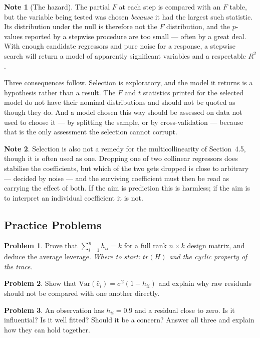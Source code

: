 \documentclass[11pt,a4paper]{article}
\theoremstyle{definition}
\newtheorem*{note}{Note}
\newtheorem{problemx}{Problem}[section]
\newenvironment{problem}{\begin{problemx}}{\end{problemx}}
\begin{document}
\begin{note}[The hazard]
The partial $F$ at each step is compared with an $F$ table, but the variable
being tested was chosen \emph{because} it had the largest such statistic. Its
distribution under the null is therefore not the $F$ distribution, and the
$p$-values reported by a stepwise procedure are too small --- often by a
great deal. With enough candidate regressors and pure noise for a response, a
stepwise search will return a model of apparently significant variables and a
respectable $R^2$.

Three consequences follow. Selection is exploratory, and the model it returns
is a hypothesis rather than a result. The $F$ and $t$ statistics printed for
the selected model do not have their nominal distributions and should not be
quoted as though they do. And a model chosen this way should be assessed on
data not used to choose it --- by splitting the sample, or by
cross-validation --- because that is the only assessment the selection cannot
corrupt.
\end{note}

\begin{note}
Selection is also not a remedy for the multicollinearity of Section~4.5,
though it is often used as one. Dropping one of two collinear regressors does
stabilise the coefficients, but which of the two gets dropped is close to
arbitrary --- decided by noise --- and the surviving coefficient must then be
read as carrying the effect of both. If the aim is prediction this is
harmless; if the aim is to interpret an individual coefficient it is not.
\end{note}

\subsection{Practice Problems}

\begin{problem}
Prove that $\sum_{i=1}^{n}h_{ii}=k$ for a full rank $n\times k$ design matrix,
and deduce the average leverage.
\emph{Where to start: $tr(H)$ and the cyclic property of the trace.}
\end{problem}

\begin{problem}
Show that $\text{Var}\left(\widehat{e}_i\right)=\sigma^2\left(1-h_{ii}\right)$
and explain why raw residuals should not be compared with one another
directly.
\end{problem}

\begin{problem}
An observation has $h_{ii}=0.9$ and a residual close to zero. Is it
influential? Is it well fitted? Should it be a concern? Answer all three and
explain how they can hold together.
\end{problem}
\end{document}
